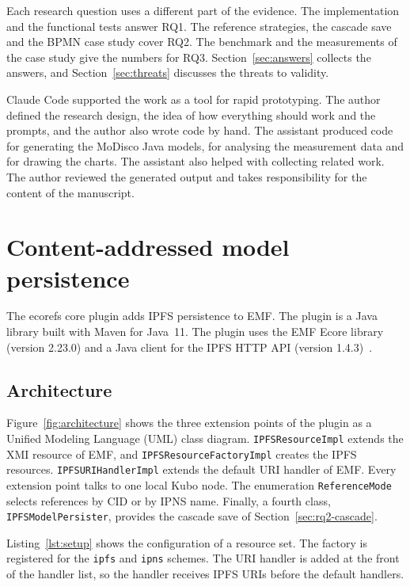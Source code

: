 \documentclass[iicol,pdflatex,sn-mathphys-num]{sn-jnl}
\theoremstyle{thmstylethree}%
\begin{document}
Each research question uses a different part of the evidence. The implementation and the functional tests answer RQ1. The reference strategies, the cascade save and the BPMN case study cover RQ2. The benchmark and the measurements of the case study give the numbers for RQ3. Section~\ref{sec:answers} collects the answers, and Section~\ref{sec:threats} discusses the threats to validity.

Claude Code supported the work as a tool for rapid prototyping. The author defined the research design, the idea of how everything should work and the prompts, and the author also wrote code by hand. The assistant produced code for generating the MoDisco Java models, for analysing the measurement data and for drawing the charts. The assistant also helped with collecting related work. The author reviewed the generated output and takes responsibility for the content of the manuscript.

\section{Content-addressed model persistence}\label{sec:rq1}

The ecorefs core plugin adds IPFS persistence to EMF. The plugin is a Java library built with Maven for Java~11. The plugin uses the EMF Ecore library (version 2.23.0) and a Java client for the IPFS HTTP API (version 1.4.3)~\cite{javaipfsclient}.

\subsection{Architecture}\label{sec:rq1-architecture}

Figure~\ref{fig:architecture} shows the three extension points of the plugin as a Unified Modeling Language (UML) class diagram. \texttt{IPFSResourceImpl} extends the XMI resource of EMF, and \texttt{IPFSResourceFactoryImpl} creates the IPFS resources. \texttt{IPFSURIHandlerImpl} extends the default URI handler of EMF. Every extension point talks to one local Kubo node. The enumeration \texttt{ReferenceMode} selects references by CID or by IPNS name. Finally, a fourth class, \texttt{IPFSModelPersister}, provides the cascade save of Section~\ref{sec:rq2-cascade}.

Listing~\ref{lst:setup} shows the configuration of a resource set. The factory is registered for the \texttt{ipfs} and \texttt{ipns} schemes. The URI handler is added at the front of the handler list, so the handler receives IPFS URIs before the default handlers.
\end{document}
